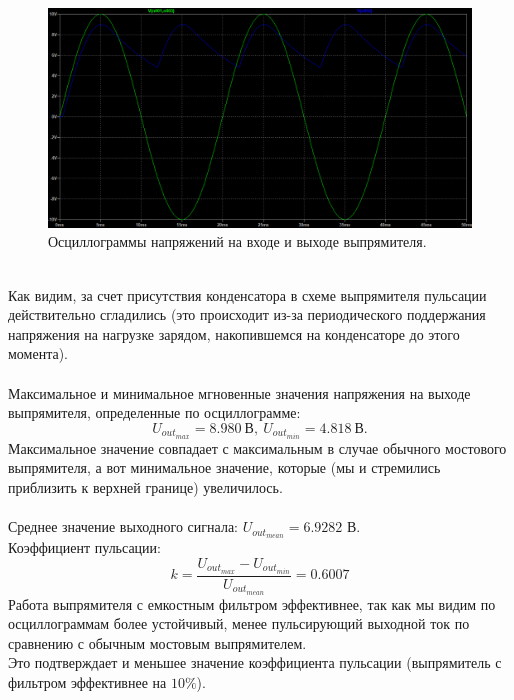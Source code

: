 \documentclass[12pt]{article}
\begin{document}
\begin{figure}[H]
    \centering
    \includegraphics[width=\textwidth]{4_1_voltages.png}
    \caption{Осциллограммы напряжений на входе и выходе выпрямителя.}
    \label{fig:4_1_voltages.png}
\end{figure}\\
Как видим, за счет присутствия конденсатора в схеме выпрямителя пульсации действительно сгладились (это происходит из-за периодического поддержания напряжения на нагрузке зарядом, накопившемся на конденсаторе до этого момента).\\
\ \\
Максимальное и минимальное мгновенные значения напряжения на выходе выпрямителя, определенные по осциллограмме:
\[
U_{out_{max}} = 8.980 \ \text{В} , \ U_{out_{min}} = 4.818 \ \text{В}.
\]
Максимальное значение совпадает с максимальным в случае обычного мостового выпрямителя, а вот минимальное значение, которые (мы и стремились приблизить к верхней границе) увеличилось.\\
\ \\
Среднее значение выходного сигнала: $U_{{out}_{mean}} = 6.9282$ В.\\
Коэффициент пульсации:
\[
k = \frac{U_{out_{max}} - U_{out_{min}}}{U_{{out}_{mean}}} = 0.6007
\]
Работа выпрямителя с емкостным фильтром эффективнее, так как мы видим по осциллограммам более устойчивый, менее пульсирующий выходной ток по сравнению с обычным мостовым выпрямителем.\\
Это подтверждает и меньшее значение коэффициента пульсации (выпрямитель с фильтром эффективнее на $ 10\% $).\\
\end{document}
